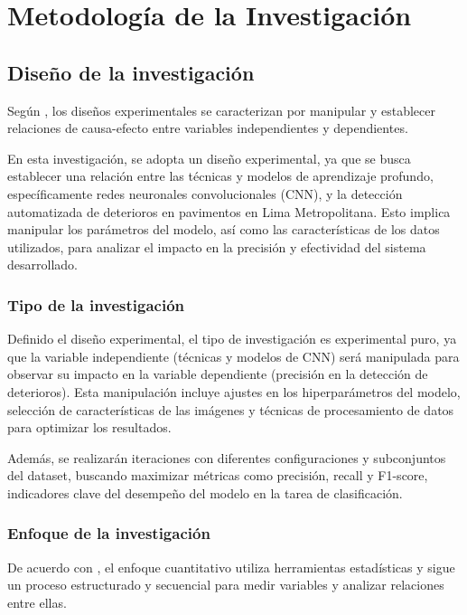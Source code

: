 \chapter{Metodología de la Investigación}

\section{Diseño de la investigación}

Según \cite{bk_sampieri2014metodologia}, los diseños experimentales se caracterizan por manipular y establecer relaciones de causa-efecto entre variables independientes y dependientes.

En esta investigación, se adopta un diseño experimental, ya que se busca establecer una relación entre las técnicas y modelos de aprendizaje profundo, específicamente redes neuronales convolucionales (CNN), y la detección automatizada de deterioros en pavimentos en Lima Metropolitana. Esto implica manipular los parámetros del modelo, así como las características de los datos utilizados, para analizar el impacto en la precisión y efectividad del sistema desarrollado.

\subsection{Tipo de la investigación}

Definido el diseño experimental, el tipo de investigación es experimental puro, ya que la variable independiente (técnicas y modelos de CNN) será manipulada para observar su impacto en la variable dependiente (precisión en la detección de deterioros). Esta manipulación incluye ajustes en los hiperparámetros del modelo, selección de características de las imágenes y técnicas de procesamiento de datos para optimizar los resultados.

Además, se realizarán iteraciones con diferentes configuraciones y subconjuntos del dataset, buscando maximizar métricas como precisión, recall y F1-score, indicadores clave del desempeño del modelo en la tarea de clasificación.

\subsection{Enfoque de la investigación}

De acuerdo con \cite{bk_sampieri2014metodologia}, el enfoque cuantitativo utiliza herramientas estadísticas y sigue un proceso estructurado y secuencial para medir variables y analizar relaciones entre ellas.

